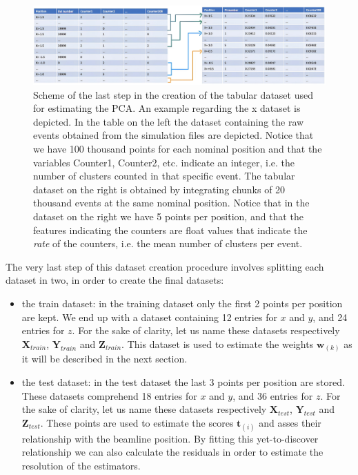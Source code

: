 \begin{figure}
    \centering
    \includegraphics[width=\textwidth]{figures/tabular_dataset.png}
    \caption{Scheme of the last step in the creation of the tabular dataset used for estimating the PCA. An example regarding the x dataset is depicted. In the table on the left the dataset containing the raw events obtained from the simulation files are depicted. Notice that we have 100 thousand points for each nominal position and that the variables Counter1, Counter2, etc. indicate an integer, i.e. the number of clusters counted in that specific event. The tabular dataset on the right is obtained by integrating chunks of 20 thousand events at the same nominal position. Notice that in the dataset on the right we have 5 points per position, and that the features indicating the counters are float values that indicate the \textit{rate} of the counters, i.e. the mean number of clusters per event.}
    \label{fig:tabular_dataset}
\end{figure}

The very last step of this dataset creation procedure involves splitting each dataset in two, in order to create the final datasets: 
\begin{itemize}
    \item the train dataset: in the training dataset only the first 2 points per position are kept. We end up with a dataset containing 12 entries for $x$ and $y$, and 24 entries for $z$. For the sake of clarity, let us name these datasets respectively $\mathbf{X}_{train}$, $\mathbf{Y}_{train}$ and $\mathbf{Z}_{train}$.  This dataset is used to estimate the weights $\mathbf{w}_{(k)}$ as it will be described in the next section.
    \item the test dataset: in the test dataset the last 3 points per position are stored. These datasets comprehend 18 entries for $x$ and $y$, and 36 entries for $z$. For the sake of clarity, let us name these datasets respectively $\mathbf{X}_{test}$, $\mathbf{Y}_{test}$ and $\mathbf{Z}_{test}$. These points are used to estimate the scores $\mathbf{t}_{(i)}$ and asses their relationship with the beamline position. By fitting this yet-to-discover relationship we can also calculate the residuals in order to estimate the resolution of the estimators.
\end{itemize}


